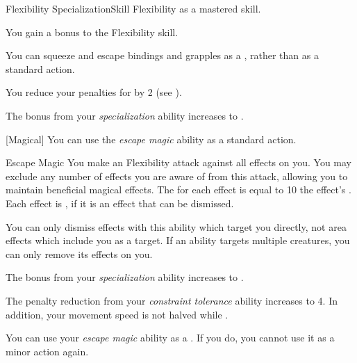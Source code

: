     \begin{feat}{Flexibility Specialization}{Skill}
        \featpre Flexibility as a mastered skill.

         You gain a  bonus to the Flexibility skill.

         You can squeeze and escape bindings and grapples as a , rather than as a standard action.

         You reduce your penalties for \squeezing by 2 (see ).

         The bonus from your \textit{specialization} ability increases to .

        [Magical] You can use the \textit{escape magic} ability as a standard action.
        \begin{freeability}{Escape Magic}
            You make an Flexibility attack against all  effects on you.
            You may exclude any number of effects you are aware of from this attack, allowing you to maintain beneficial magical effects.
            The  for each effect is equal to 10 \add the effect's .
            \hit Each effect is , if it is an effect that can be dismissed.
        \end{freeability}

        You can only dismiss effects with this ability which target you directly, not area effects which include you as a target.
        If an ability targets multiple creatures, you can only remove its effects on you.

         The bonus from your \textit{specialization} ability increases to .

         The penalty reduction from your \textit{constraint tolerance} ability increases to 4.
        In addition, your movement speed is not halved while \squeezing.

         You can use your \textit{escape magic} ability as a .
        If you do, you  cannot use it as a minor action again.
    \end{feat}

